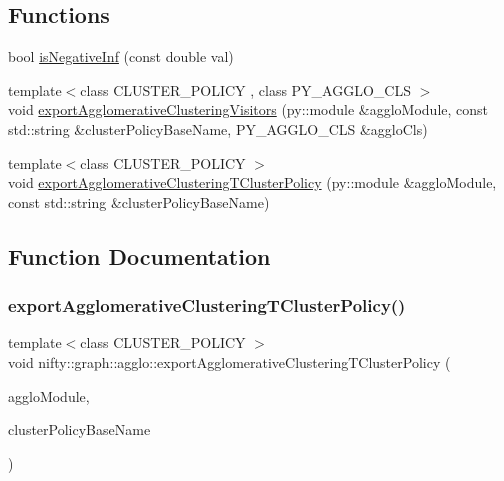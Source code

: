 \subsection*{Functions}
\begin{DoxyCompactItemize}
\item 
bool \hyperlink{namespacenifty_1_1graph_1_1agglo_a20068bfcbc3173c0d9da085bfb0b4b23}{is\+Negative\+Inf} (const double val)
\item 
{\footnotesize template$<$class C\+L\+U\+S\+T\+E\+R\+\_\+\+P\+O\+L\+I\+CY , class P\+Y\+\_\+\+A\+G\+G\+L\+O\+\_\+\+C\+LS $>$ }\\void \hyperlink{namespacenifty_1_1graph_1_1agglo_a4f7f64daedf9d50119ccf491a948f309}{export\+Agglomerative\+Clustering\+Visitors} (py\+::module \&agglo\+Module, const std\+::string \&cluster\+Policy\+Base\+Name, P\+Y\+\_\+\+A\+G\+G\+L\+O\+\_\+\+C\+LS \&agglo\+Cls)
\item 
{\footnotesize template$<$class C\+L\+U\+S\+T\+E\+R\+\_\+\+P\+O\+L\+I\+CY $>$ }\\void \hyperlink{namespacenifty_1_1graph_1_1agglo_ac1f80b0263547645d7f6603e7a094bd1}{export\+Agglomerative\+Clustering\+T\+Cluster\+Policy} (py\+::module \&agglo\+Module, const std\+::string \&cluster\+Policy\+Base\+Name)
\end{DoxyCompactItemize}


\subsection{Function Documentation}
\mbox{\label{namespacenifty_1_1graph_1_1agglo_ac1f80b0263547645d7f6603e7a094bd1}} 
\subsubsection{\texorpdfstring{export\+Agglomerative\+Clustering\+T\+Cluster\+Policy()}{exportAgglomerativeClusteringTClusterPolicy()}}
{\footnotesize\ttfamily template$<$class C\+L\+U\+S\+T\+E\+R\+\_\+\+P\+O\+L\+I\+CY $>$ \\
void nifty\+::graph\+::agglo\+::export\+Agglomerative\+Clustering\+T\+Cluster\+Policy (\begin{DoxyParamCaption}\item[{py\+::module \&}]{agglo\+Module,  }\item[{const std\+::string \&}]{cluster\+Policy\+Base\+Name }\end{DoxyParamCaption})}


